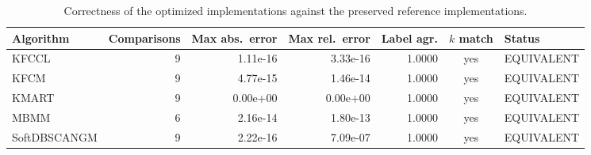 \begin{table}[t]
\centering
\caption{Correctness of the optimized implementations against the preserved reference implementations.}
\label{tab:correctness}
\begin{tabular}{lrrrrcl}
\toprule
Algorithm & Comparisons & Max abs.\ error & Max rel.\ error & Label agr. & $k$ match & Status \\
\midrule
KFCCL & 9 & 1.11e-16 & 3.33e-16 & 1.0000 & yes & EQUIVALENT \\
KFCM & 9 & 4.77e-15 & 1.46e-14 & 1.0000 & yes & EQUIVALENT \\
KMART & 9 & 0.00e+00 & 0.00e+00 & 1.0000 & yes & EQUIVALENT \\
MBMM & 6 & 2.16e-14 & 1.80e-13 & 1.0000 & yes & EQUIVALENT \\
SoftDBSCANGM & 9 & 2.22e-16 & 7.09e-07 & 1.0000 & yes & EQUIVALENT \\
\bottomrule
\end{tabular}
\end{table}
